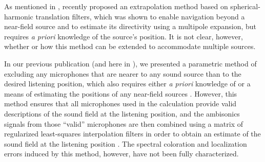 As mentioned in , \citet{Wakayama2017} recently proposed an extrapolation method based on spherical-harmonic translation filters, which was shown to enable navigation beyond a near-field source and to estimate its directivity using a multipole expansion, but requires \textit{a priori} knowledge of the source's position.
It is not clear, however, whether or how this method can be extended to accommodate multiple sources.

In our previous publication (and here in ), we presented a parametric method of excluding any microphones that are nearer to any sound source than to the desired listening position, which also requires either \textit{a priori} knowledge of or a means of estimating the positions of any near-field sources \citep[section 3.3]{TylkaChoueiri2016}.
However, this method ensures that all microphones used in the calculation provide valid descriptions of the sound field at the listening position, and the ambisonics signals from those ``valid'' microphones are then combined using a matrix of regularized least-squares interpolation filters in order to obtain an estimate of the sound field at the listening position \citep[section 3.2]{TylkaChoueiri2016}.
The spectral coloration and localization errors induced by this method, however, have not been fully characterized.

